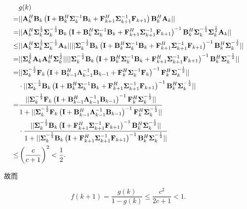 \documentclass[a4paper,11pt]{article}
\newcommand\V[1]{\mathrm{\bf{#1}}}
\newcommand\Nm[1]{\lvert\lvert #1\rvert\rvert}
\newcommand\SB[1]{\left(#1\right)}
\begin{document}
\begin{equation}
\begin{split}
&g(k)\\
=&\Nm{\V{A}_k^H\V{B}_k\SB{\V{I}+\V{B}_{k}^H\bm{\Sigma}^{-1}_{k}\V{B}_{k}+\V{F}_{k+1}^H\bm{\Sigma}^{-1}_{k+1}\V{F}_{k+1}}\V{B}_k^H\V{A}_k}\\
=&\Nm{\V{A}_k^H \bm{\Sigma}_k^{\frac{1}{2}}\bm{\Sigma}_k^{-\frac{1}{2}} \V{B}_k\SB{\V{I}+\V{B}_{k}^H\bm{\Sigma}^{-1}_{k}\V{B}_{k}+\V{F}_{k+1}^H\bm{\Sigma}^{-1}_{k+1}\V{F}_{k+1}}^{-1}\V{B}_k^H \bm{\Sigma}_k^{-\frac{1}{2}}\bm{\Sigma}_k^{\frac{1}{2}} \V{A}_k}\\
\leq & \Nm{\V{A}_k^H \bm{\Sigma}_k^{\frac{1}{2}}\bm{\Sigma}_k^{-\frac{1}{2}} \V{A}_k }\Nm{\bm{\Sigma}_k^{-\frac{1}{2}} \V{B}_k\SB{\V{I}+\V{B}_{k}^H\bm{\Sigma}^{-1}_{k}\V{B}_{k}+\V{F}_{k+1}^H\bm{\Sigma}^{-1}_{k+1}\V{F}_{k+1}}^{-1}\V{B}_k^H \bm{\Sigma}_k^{-\frac{1}{2}}}\\
=& \Nm{\bm{\Sigma}_k^{\frac{1}{2}} \V{A}_k \V{A}_k^H \bm{\Sigma}_k^{\frac{1}{2}}}\Nm{\bm{\Sigma}_k^{-\frac{1}{2}} \V{B}_k\SB{\V{I}+\V{B}_{k}^H\bm{\Sigma}^{-1}_{k}\V{B}_{k}+\V{F}_{k+1}^H\bm{\Sigma}^{-1}_{k+1}\V{F}_{k+1}}^{-1}\V{B}_k^H \bm{\Sigma}_k^{-\frac{1}{2}}}\\
=& \Nm{\bm{\Sigma}_k^{-\frac{1}{2}} \V{F}_k\SB{\V{I}+\V{B}_{k-1}^H\bm{\Lambda}^{-1}_{k-1}\V{B}_{k-1}+\V{F}_{k}^H\bm{\Sigma}^{-1}_{k}\V{F}_{k}}^{-1}\V{F}_k^H \bm{\Sigma}_k^{-\frac{1}{2}}}\\
 &\cdot\Nm{\bm{\Sigma}_k^{-\frac{1}{2}} \V{B}_k\SB{\V{I}+\V{B}_{k}^H\bm{\Sigma}^{-1}_{k}\V{B}_{k}+\V{F}_{k+1}^H\bm{\Sigma}^{-1}_{k+1}\V{F}_{k+1}}^{-1}\V{B}_k^H \bm{\Sigma}_k^{-\frac{1}{2}}}\\
 =&\frac{\Nm{\bm{\Sigma}_k^{-\frac{1}{2}} \V{F}_k\SB{\V{I}+\V{B}_{k-1}^H\bm{\Lambda}^{-1}_{k-1}\V{B}_{k-1}}^{-1}\V{F}_k^H \bm{\Sigma}_k^{-\frac{1}{2}}}}{1+\Nm{\bm{\Sigma}_k^{-\frac{1}{2}} \V{F}_k\SB{\V{I}+\V{B}_{k-1}^H\bm{\Lambda}^{-1}_{k-1}\V{B}_{k-1}}^{-1}\V{F}_k^H \bm{\Sigma}_k^{-\frac{1}{2}}}}\\
 &\cdot\frac{\Nm{\bm{\Sigma}_k^{-\frac{1}{2}} \V{B}_k\SB{\V{I}+\V{F}_{k+1}^H\bm{\Sigma}^{-1}_{k+1}\V{F}_{k+1}}^{-1}\V{B}_k^H \bm{\Sigma}_k^{-\frac{1}{2}}}}{1+\Nm{\bm{\Sigma}_k^{-\frac{1}{2}} \V{B}_k\SB{\V{I}+\V{F}_{k+1}^H\bm{\Sigma}^{-1}_{k+1}\V{F}_{k+1}}^{-1}\V{B}_k^H \bm{\Sigma}_k^{-\frac{1}{2}}}}\\
 \leq & \SB{\frac{c}{c+1}}^2<\frac{1}{2}.
\end{split}
\end{equation}

故而

\begin{equation}
f(k+1)=\frac{g(k)}{1-g(k)}\leq \frac{c^2}{2c+1}<1.
\end{equation}
\end{document}
